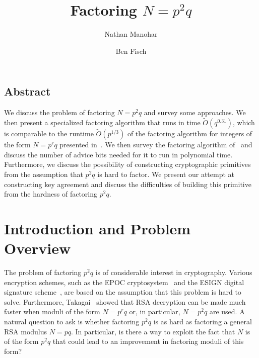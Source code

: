 \documentclass[letterpaper,twocolumn,10pt]{article}
\begin{document}
\date{}

\title{\Large \bf Factoring $N = p^2 q$}

\author{
{\rm Nathan Manohar}\\
\and
{\rm Ben Fisch}\\
} %

\maketitle

\thispagestyle{empty}


\subsection*{Abstract}

We discuss the problem of factoring $N = p^2 q$ and survey some approaches. We then present a specialized factoring algorithm that runs in time $\tilde{O}(q^{0.31})$, which is comparable to the runtime $\tilde{O}(p^{1/3})$ of the factoring algorithm for integers of the form $N = p^r q$ presented in~\cite{dan}. We then survey the factoring algorithm of~\cite{dan} and discuss the number of advice bits needed for it to run in polynomial time. Furthermore, we discuss the possibility of constructing cryptographic primitives from the assumption that $p^2 q$ is hard to factor. We present our attempt at constructing key agreement and discuss the difficulties of building this primitive from the hardness of factoring $p^2 q$.

\section{Introduction and Problem Overview}

The problem of factoring $p^2 q$ is of considerable interest in cryptography. Various encryption schemes, such as the EPOC cryptosystem~\cite{Okamoto} and the ESIGN digital signature scheme~\cite{esign}, are based on the assumption that this problem is hard to solve. Furthermore, Takagai~\cite{Takagai} showed that RSA decryption can be made much faster when moduli of the form $N = p^r q$ or, in particular, $N = p^2 q$ are used. A natural question to ask is whether factoring $p^2q$ is as hard as factoring a general RSA modulus $N = pq$. In particular, is there a way to exploit the fact that $N$ is of the form $p^2q$ that could lead to an improvement in factoring moduli of this form? 
\end{document}
